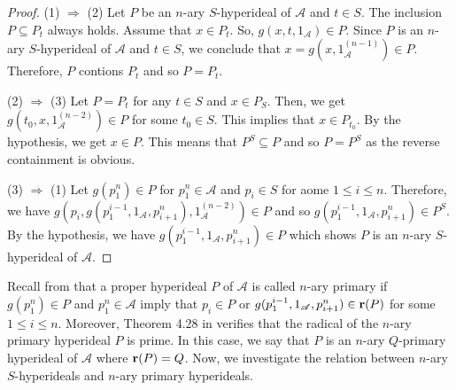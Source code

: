 \documentclass[preprint,review,10pt]{amsart}
\theoremstyle{definition}
\newtheorem{example}[theorem]{Example}
\theoremstyle{remark}
\numberwithin{equation}{section}
\begin{document}
\begin{proof}
(1) $\Longrightarrow$ (2) Let $P$ be an $n$-ary $S$-hyperideal of $\mathscr{A}$ and $t \in S$. The inclusion $P \subseteq P_t$ always holds. Assume that $x \in P_t$. So, $g(x,t,1_\mathscr{A}) \in P $. Since $P$ is an $n$-ary $S$-hyperideal of $\mathscr{A}$ and $t \in S$, we conclude that $x=g(x,1_\mathscr{A}^{(n-1)}) \in P $. Therefore, $P$ contions $P_t$ and so $P=P_t$.

(2) $\Longrightarrow$ (3) Let $P=P_t$ for any $t \in S$ and $x \in P_S$. Then, we get $g(t_0,x,1_\mathscr{A}^{(n-2)}) \in P $ for some $t_0 \in S$. This implies that $x \in P_{t_0}$. By the hypothesis, we get $x \in P$. This means that $P^S \subseteq P$ and so  $P=P^S$ as the reverse containment is obvious.

(3) $\Longrightarrow$ (1) Let $g(p_1^n) \in P$ for $p_1^n \in \mathscr{A}$ and $p_i \in S$ for aome $1 \leq i \leq n$. Therefore, we have $g(p_i,g(p_1^{i-1}, 1_\mathscr{A},p_{i+1}^n),1_\mathscr{A}^{(n-2)}) \in P$  and so $g(p_1^{i-1}, 1_\mathscr{A},p_{i+1}^n) \in P^S $. By the hypothesis, we have $g(p_1^{i-1}, 1_\mathscr{A},p_{i+1}^n) \in P $ which shows $P$ is an $n$-ary $S$-hyperideal of $\mathscr{A}$.
\end{proof}

Recall from \cite{sorc1} that  a proper hyperideal  $P$ of $\mathscr{A}$ is called $n$-ary  primary  if $g(p^n _1) \in P$ and $p_1^ n \in \mathscr{A}$ imply that $p_i \in P$ or $g(p_1^{i-1}, 1_\mathscr{A}, p_{ i+1}^n) \in {\bf r}(P)$ for some $ 1 \leq i \leq n$. Moreover, Theorem 4.28 in \cite{sorc1} verifies that the radical of the $n$-ary primary hyperideal $P$ is prime. In this case, we say that $P$ is an $n$-ary $Q$-primary hyperideal of $\mathscr{A}$ where ${\bf r} (P)=Q$. Now, we investigate the relation between $n$-ary $S$-hyperideals and $n$-ary primary hyperideals. 
\end{document}
